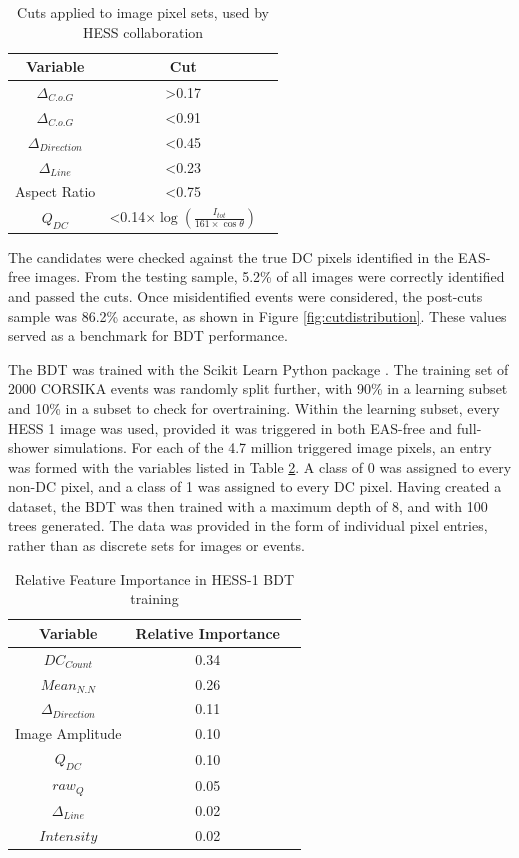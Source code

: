 \documentclass[]{article}
\begin{document}
\begin{table}[h!]
  \centering
  \caption{Cuts applied to image pixel sets, used by HESS collaboration \cite{hess07}}
  \label{tab:qdccuts}
  \begin{tabular}{ccc}
    \toprule
    Variable & Cut\\
    \midrule
     $ \Delta_{C.o.G}$ & \textgreater 0.17 \\
     $ \Delta_{C.o.G}$ & \textless 0.91 \\
     $\Delta_{Direction}$ & \textless 0.45 \\
     $\Delta_{Line}$ & \textless 0.23 \\
     Aspect Ratio & \textless 0.75 \\
     $Q_{DC}$ & \textless 0.14$ \times \log(\frac{I_{tot}}{161 \times \cos \theta})$ \\
    \bottomrule
  \end{tabular}
\end{table}

The candidates were checked against the true DC pixels identified in the EAS-free images. From the testing sample, 5.2\% of all images were correctly identified and passed the cuts. Once misidentified events were considered, the post-cuts sample was 86.2\% accurate, as shown in Figure \ref{fig:cutdistribution}. These values served as a benchmark for BDT performance. 

The BDT was trained with the Scikit Learn Python package \cite{scikit-learn}. The training set of 2000 CORSIKA events was randomly split further, with 90\% in a learning subset and 10\% in a subset to check for overtraining. Within the learning subset, every HESS 1 image was used, provided it was triggered in both EAS-free and full-shower simulations. For each of the 4.7 million triggered image pixels, an entry was formed with the variables listed in Table \ref{tab:hess1classifier}. A class of 0 was assigned to every non-DC pixel, and a class of 1 was assigned to every DC pixel. Having created a dataset, the BDT was then trained with a maximum depth of 8, and with 100 trees generated. The data was provided in the form of individual pixel entries, rather than as discrete sets for images or events.

\begin{table}[h!]
  \centering
  \caption{Relative Feature Importance in HESS-1 BDT training}
  \label{tab:hess1classifier}
  \begin{tabular}{ccc}
    \toprule
    Variable & Relative Importance\\
    \midrule
    $DC_{Count}$ & 0.34\\
    $Mean_{N.N}$ & 0.26\\
    $\Delta_{Direction}$ & 0.11\\
    Image Amplitude & 0.10\\
    $Q_{DC}$ & 0.10\\
    $raw_{Q}$ & 0.05\\
    $\Delta_{Line}$ & 0.02\\
    $Intensity$ & 0.02\\
    \bottomrule
  \end{tabular}
\end{table}
\end{document}
